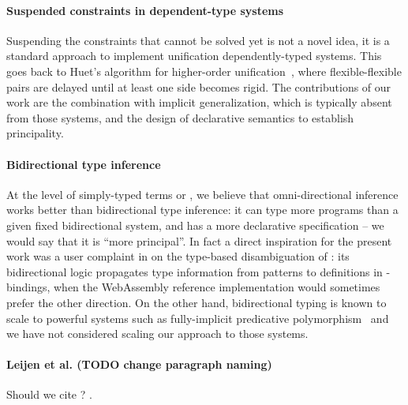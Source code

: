 \documentclass[acmsmall,screen,nonacm,review]{acmart}
\begin{document}
\paragraph{Suspended constraints in dependent-type systems}
Suspending the constraints that cannot be solved yet is not a novel
idea, it is a standard approach to implement unification
dependently-typed systems. This goes back to Huet's algorithm for
higher-order unification~\citep*{huet-unif}, where flexible-flexible
pairs are delayed until at least one side becomes rigid. The
contributions of our work are the combination with implicit
generalization, which is typically absent from those systems, and the
design of declarative semantics to establish principality.

\paragraph{Bidirectional type inference} At the level of simply-typed
terms or \ML, we believe that omni-directional inference works better
than bidirectional type inference: it can type more programs than
a given fixed bidirectional system, and has a more declarative
specification -- we would say that it is ``more principal''. In fact
a direct inspiration for the present work was a user complaint in
\citet*{rossberg-wasm} on the type-based disambiguation of \OCaml: its
bidirectional logic propagates type information from patterns to
definitions in -bindings, when the WebAssembly reference
implementation would sometimes prefer the other direction.
%
%
On the other hand, bidirectional typing is known to scale to powerful
systems such as fully-implicit predicative
polymorphism~\citep*{dunfield-krishnaswami-bidirectional-poly} and we
have not considered scaling our approach to those systems.

\paragraph{Leijen et al. (TODO change paragraph naming)}
Should we cite \cite{Leijen-Ye/prefix@pldi2025}?
.

\paragraph{\OutsideIn}
\end{document}
